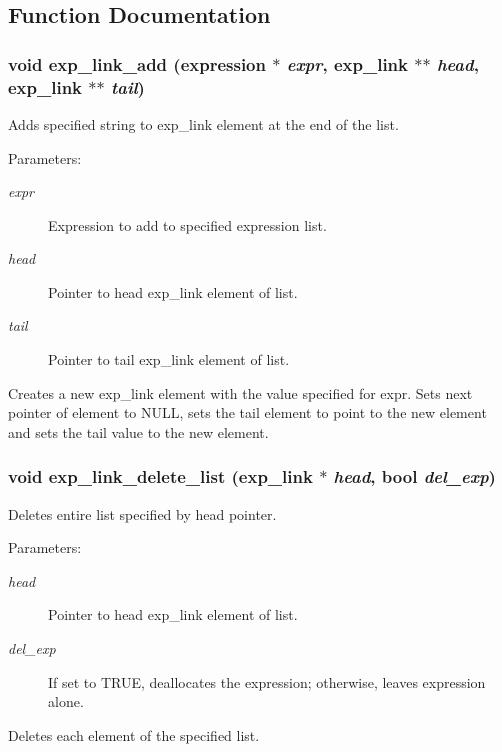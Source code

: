 \subsection{Function Documentation}
\subsubsection{\setlength{\rightskip}{0pt plus 5cm}void exp\_\-link\_\-add ({\bf expression} $\ast$ {\em expr}, {\bf exp\_\-link} $\ast$$\ast$ {\em head}, {\bf exp\_\-link} $\ast$$\ast$ {\em tail})}\label{link_8h_a1}


Adds specified string to exp\_\-link element at the end of the list.

\begin{Desc}
\item[Parameters: ]\par
\begin{description}
\item[{\em 
expr}]Expression to add to specified expression list. \item[{\em 
head}]Pointer to head exp\_\-link element of list. \item[{\em 
tail}]Pointer to tail exp\_\-link element of list.\end{description}
\end{Desc}
Creates a new exp\_\-link element with the value specified for expr. Sets next pointer of element to NULL, sets the tail element to point to the new element and sets the tail value to the new element. 
\subsubsection{\setlength{\rightskip}{0pt plus 5cm}void exp\_\-link\_\-delete\_\-list ({\bf exp\_\-link} $\ast$ {\em head}, {\bf bool} {\em del\_\-exp})}\label{link_8h_a13}


Deletes entire list specified by head pointer.

\begin{Desc}
\item[Parameters: ]\par
\begin{description}
\item[{\em 
head}]Pointer to head exp\_\-link element of list. \item[{\em 
del\_\-exp}]If set to TRUE, deallocates the expression; otherwise, leaves expression alone.\end{description}
\end{Desc}
Deletes each element of the specified list. 
